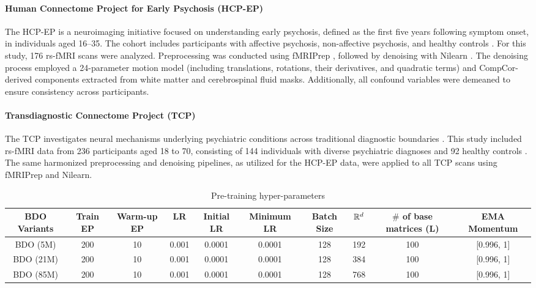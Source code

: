 \paragraph{Human Connectome Project for Early Psychosis (HCP-EP)}
\label{sec:hcpep}
The HCP-EP is a neuroimaging initiative focused on understanding early psychosis, defined as the first five years following symptom onset, in individuals aged 16–35. The cohort includes participants with affective psychosis, non-affective psychosis, and healthy controls \cite{jacobs2024introduction, Prunier2021-ao}. For this study, 176 rs-fMRI scans were analyzed. Preprocessing was conducted using fMRIPrep \cite{esteban2019fmriprep}, followed by denoising with Nilearn \cite{Nilearn}. The denoising process employed a 24-parameter motion model (including translations, rotations, their derivatives, and quadratic terms) and CompCor-derived components extracted from white matter and cerebrospinal fluid masks. Additionally, all confound variables were demeaned to ensure consistency across participants.
\paragraph{Transdiagnostic Connectome Project (TCP)}
\label{sec:tcp}
The TCP investigates neural mechanisms underlying psychiatric conditions across traditional diagnostic boundaries \cite{chopra2024transdiagnostic}. This study included rs-fMRI data from 236 participants aged 18 to 70, consisting of 144 individuals with diverse psychiatric diagnoses and 92 healthy controls \cite{ds005237:1.0.0}. The same harmonized preprocessing and denoising pipelines, as utilized for the HCP-EP data, were applied to all TCP scans using fMRIPrep and Nilearn.



\begin{table}[ht!]
\caption{Pre-training hyper-parameters}
\vspace{-2mm}
\label{table:pretraining_hyperparameters}
\scriptsize
\centering
\begin{tabular}{c|ccccccccc}
\toprule
\textbf{BDO Variants} & \textbf{Train EP} & \textbf{Warm-up EP} & \textbf{LR} &\textbf{Initial LR} &\textbf{Minimum LR} & \textbf{Batch Size} & \textbf{$\mathbb{R}^d$} & \textbf{$\#$ of base matrices} (L)  & \textbf{EMA Momentum} \\ 
\midrule
BDO (5M) & 200 & 10 & 0.001 & 0.0001 & 0.0001 & 128 & 192 & 100 & [0.996, 1] \\
BDO (21M) & 200 & 10 & 0.001 & 0.0001 & 0.0001 & 128 & 384 & 100 & [0.996, 1] \\
BDO (85M) & 200 & 10 & 0.001 & 0.0001 & 0.0001 & 128 & 768 & 100 & [0.996, 1] \\
\bottomrule
\end{tabular}
\vspace{-2mm}
\end{table}

